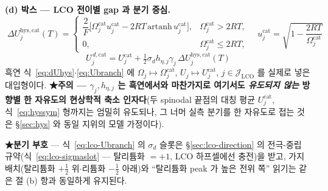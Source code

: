 \documentclass[11pt,a4paper]{article}
\newcommand{\hys}{\mathrm{hys}}
\begin{document}
\textbf{(d) 박스 — LCO 전이별 gap 과 분기 중심.}
\begin{equation}
\boxed{\;
\Delta U_j^{\hys,\mathrm{cat}}(T)=
\begin{cases}
\dfrac{2}{F}\big[\Omega_j^\mathrm{cat}u_j^\mathrm{cat}-2RT\,\mathrm{artanh}\,u_j^\mathrm{cat}\big],
& \Omega_j^\mathrm{cat}>2RT,\\[4pt]
0, & \Omega_j^\mathrm{cat}\le2RT,
\end{cases}
\quad u_j^\mathrm{cat}=\sqrt{1-\dfrac{2RT}{\Omega_j^\mathrm{cat}}}\;}
\label{eq:lco-dUhys}
\end{equation}
\begin{equation}
\boxed{\;
U_j^{\,d,\mathrm{cat}}=U_j^\mathrm{cat}
+\tfrac12\sigma_d h_{\eta,j}\gamma_j\,\Delta U_j^{\hys,\mathrm{cat}}(T)\;}
\label{eq:lco-Ubranch}
\end{equation}
흑연 식~\eqref{eq:dUhys}$\cdot$\eqref{eq:Ubranch} 에 $\Omega_j\mapsto\Omega_j^\mathrm{cat}$,
$U_j\mapsto U_j^\mathrm{cat}$, $j\in\mathcal J_\mathrm{LCO}$ 를 실제로 넣은 대입형이다. \textbf{★주의 — $\gamma_j,h_{\eta,j}$ 는 흑연에서와 마찬가지로 여기서도
\emph{유도되지 않는} 방향별 한 자유도의 현상학적 축소 인자다}(두 spinodal 끝점의 대칭 평균
$U_j^\mathrm{cat}$, 식~\eqref{eq:hyssym} 형까지는 엄밀히 유도되나, 그 너머 실측 분기를 한 자유도로 접는
것은 \S\ref{sec:hys} 와 동일 지위의 모델 가정이다).

\textbf{★분기 부호} — 식~\eqref{eq:lco-Ubranch} 의 $\sigma_d$ 슬롯은 \S\ref{sec:lco-direction} 의 전극-중립
규약(식~\eqref{eq:lco-sigmaslot} --- 탈리튬화 $=+1$, LCO 하프셀에선 충전)을 받고, 가지 배치(탈리튬화
$+\tfrac12$ 위$\cdot$리튬화 $-\tfrac12$ 아래)와 ``탈리튬화 peak 가 높은 전위 쪽'' 읽기는 같은 절 (b) 항과
동일하게 유지된다.
\end{document}
